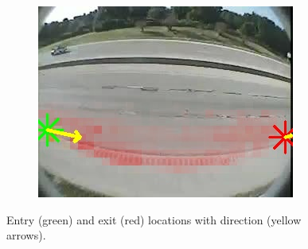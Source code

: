 \begin{figure}
\begin{subfigure}{0.32\linewidth}
            \includegraphics[width=\linewidth]{./img/scene_learning/res/252707/252707-2.jpg}
        \end{subfigure}
        \caption{Entry (green) and exit (red) locations with direction (yellow arrows).}
        \label{fig:entry-exit-full-2}
\end{figure}

